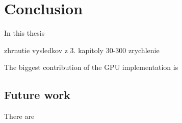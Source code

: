 \chapter*{Conclusion}

In this thesis

zhrnutie vysledkov z 3. kapitoly 30-300 zrychlenie


The biggest contribution of the GPU implementation is

\section*{Future work}

There are 